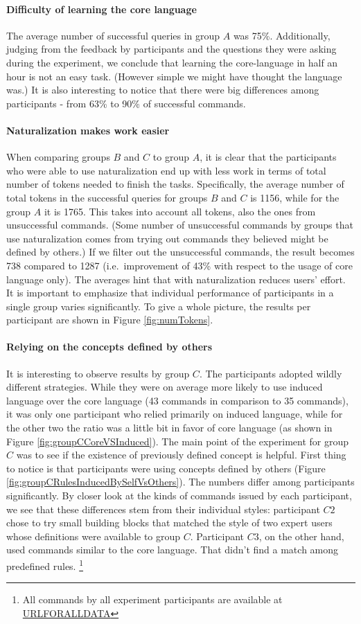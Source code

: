 \paragraph*{\textbf{Difficulty of learning the core language}} The average number of successful queries in group $A$ was 75\%. Additionally, judging from the feedback by participants and the questions they were asking during the experiment, we conclude that learning the core-language in half an hour is not an easy task. (However simple we might have thought the language was.) It is also interesting to notice that there were big differences among participants - from 63\% to 90\% of successful commands.
\paragraph*{\textbf{Naturalization makes work easier}} When comparing groups $B$ and $C$ to group $A$, it is clear that the participants who were able to use naturalization end up with less work in terms of total number of tokens needed to finish the tasks. Specifically, the average number of total tokens in the successful queries for groups $B$ and $C$ is 1156, while for the group $A$ it is 1765. This takes into account all tokens, also the ones from unsuccessful commands. (Some number of unsuccessful commands by groups that use naturalization comes from trying out commands they believed might be defined by others.) If we filter out the unsuccessful commands, the result becomes 738 compared to 1287 (i.e.\ improvement of 43\% with respect to the usage of core language only).  The averages hint that with naturalization reduces users' effort. It is important to emphasize that individual performance of participants in a single group varies significantly. To give a whole picture, the results per participant are shown in Figure \ref{fig:numTokens}.
\paragraph*{\textbf{Relying on the concepts defined by others}} It is interesting to observe results by group $C$. The participants adopted wildly different strategies. While they were on average more likely to use induced language over the core language (43 commands in comparison to 35 commands), it was only one participant who relied primarily on induced language, while for the other two the ratio was a little bit in favor of core language (as shown in Figure \ref{fig:groupCCoreVSInduced}). The main point of the experiment for group $C$ was to see if the existence of previously defined concept is helpful. First thing to notice is that participants were using concepts defined by others (Figure \ref{fig:groupCRulesInducedBySelfVsOthers}). The numbers differ among participants significantly. By closer look at the kinds of commands issued by each participant, we see that these differences stem from their individual styles: participant $C2$ chose to try small building blocks that matched the style of two expert users whose definitions were available to group $C$. Participant $C3$, on the other hand, used commands similar to the core language. That didn't find a match among predefined rules. \footnote{All commands by all experiment participants are available at \url{URLFORALLDATA}}
